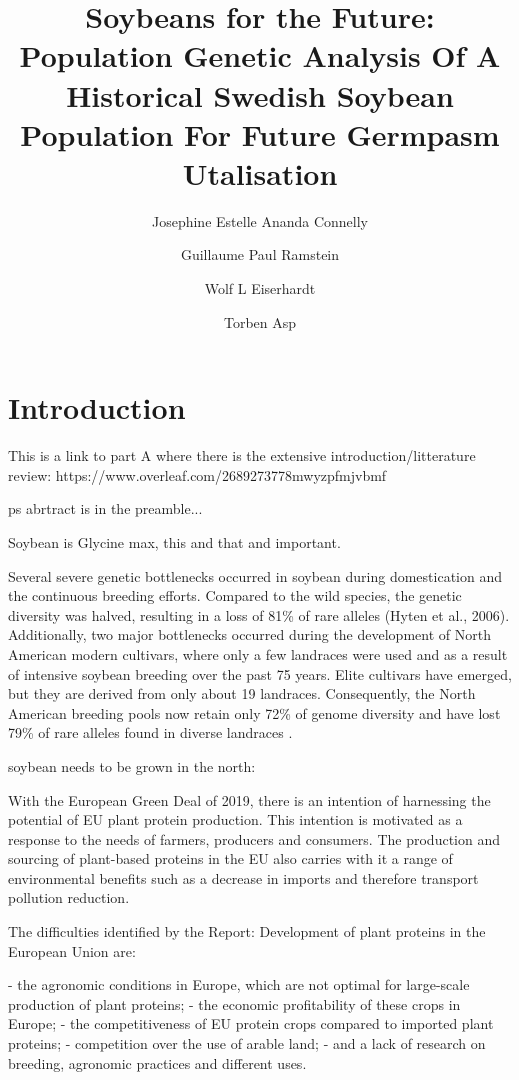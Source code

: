 \documentclass[9pt, twocolumn,twoside]{gsajnl}
\title{Soybeans for the Future: Population Genetic Analysis Of A Historical Swedish Soybean Population For Future Germpasm Utalisation}
\author[1,$\ast$]{Josephine Estelle Ananda Connelly}
\author[2,$\dagger$]{Guillaume Paul Ramstein}
\author[3,$\dagger$]{Wolf L Eiserhardt}
\author[4,$\dagger$]{Torben Asp}
\affil[1,2,4]{Centre for Quantitative Genetics and Genomics, Faculty of Technical Sciences, Aarhus University (DK).}
\affil[1,3]{Department of Biology, Faculty of Natural Sciences, Aarhus University, (DK).}
\affil[3]{Royal Botanic Gardens, Kew, (UK).}
\affil[$\dagger$]{These authors share senior authorship}
\begin{document}
\maketitle
\thispagestyle{firststyle}
\vspace{-13pt}

\section{Introduction}

This is a link to part A where there is the extensive introduction/litterature review:
https://www.overleaf.com/2689273778mwyzpfmjvbmf

ps abrtract is in the preamble...

Soybean is Glycine max, this and that and important.

Several severe genetic bottlenecks occurred in soybean during domestication and the continuous breeding efforts. Compared to the wild species, the genetic diversity was halved, resulting in a loss of 81\% of rare alleles (Hyten et al., 2006). Additionally, two major bottlenecks occurred during the development of North American modern cultivars, where only a few landraces were used and as a result of intensive soybean breeding over the past 75 years. Elite cultivars have emerged, but they are derived from only about 19 landraces. Consequently, the North American breeding pools now retain only 72\% of genome diversity and have lost 79\% of rare alleles found in diverse landraces \cite{gizlice96}.

soybean needs to be grown in the north:

With the European Green Deal of 2019, there is an intention of harnessing the potential of EU plant protein production. This intention is motivated as a response to the needs of farmers, producers and consumers. 
The production and sourcing of plant-based proteins in the EU also carries with it a range of environmental benefits such as a decrease in imports and therefore transport pollution reduction. 

The difficulties identified by the Report: Development of plant proteins in the European Union \cite{EC18} are:

- the agronomic conditions in Europe, which are not optimal for large-scale production of plant proteins; 
- the economic profitability of these crops in Europe; 
- the competitiveness of EU protein crops compared to imported plant proteins; 
- competition over the use of arable land; 
- and a lack of research on breeding, agronomic practices and different uses. 
\end{document}
